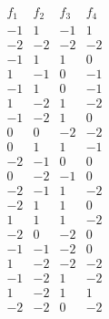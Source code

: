 $$\begin{array}{rrrr} 
f_1 & f_2 & f_3 & f_4 \\ 
\hline 
-1 &  1 & -1 &  1 \\ 
-2 & -2 & -2 & -2 \\ 
-1 &  1 &  1 &  0 \\ 
 1 & -1 &  0 & -1 \\ 
-1 &  1 &  0 & -1 \\ 
 1 & -2 &  1 & -2 \\ 
-1 & -2 &  1 &  0 \\ 
 0 &  0 & -2 & -2 \\ 
 0 &  1 &  1 & -1 \\ 
-2 & -1 &  0 &  0 \\ 
 0 & -2 & -1 &  0 \\ 
-2 & -1 &  1 & -2 \\ 
-2 &  1 &  1 &  0 \\ 
 1 &  1 &  1 & -2 \\ 
-2 &  0 & -2 &  0 \\ 
-1 & -1 & -2 &  0 \\ 
 1 & -2 & -2 & -2 \\ 
-1 & -2 &  1 & -2 \\ 
 1 & -2 &  1 &  1 \\ 
-2 & -2 &  0 & -2 \\ 
\end{array}$$ 
